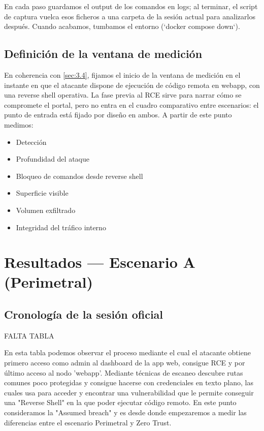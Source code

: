 \documentclass[11pt,spanish,listoffigures,listoftables]{tfgetsinf}
\begin{document}
        En cada paso guardamos el output de los comandos en logs; al terminar, el script de captura vuelca esos ficheros a una carpeta de la sesión actual para analizarlos después. Cuando acabamos, tumbamos el entorno (`docker compose down`).
        
        \subsection{Definición de la ventana de medición}
        \label{sec:6.1.3}

        En coherencia con \cref{sec:3.4}, fijamos el inicio de la ventana de medición en el instante en que el atacante dispone de ejecución de código remota en webapp, con una reverse shell operativa. La fase previa al RCE sirve para narrar cómo se compromete el portal, pero no entra en el cuadro comparativo entre escenarios: el punto de entrada está fijado por diseño en ambos. A partir de este punto medimos:
        \begin{itemize}
            \item Detección
            \item Profundidad del ataque
            \item Bloqueo de comandos desde reverse shell
            \item Superficie visible
            \item Volumen exfiltrado
            \item Integridad del tráfico interno
        \end{itemize}
        
    \section{Resultados — Escenario A (Perimetral)}
    \label{sec:6.2}
        \subsection{Cronología de la sesión oficial}
        FALTA TABLA

        En esta tabla podemos observar el proceso mediante el cual el atacante obtiene primero acceso como admin al dashboard de la app web, consigue RCE y por último acceso al nodo 'webapp'. Mediante técnicas de escaneo descubre rutas comunes poco protegidas y consigue hacerse con credenciales en texto plano, las cuales usa para acceder y encontrar una vulnerabilidad que le permite conseguir una "Reverse Shell" en la que poder ejecutar código remoto. En este punto consideramos la "Assumed breach" y es desde donde empezaremos a medir las diferencias entre el escenario Perimetral y Zero Trust.
        
\end{document}
